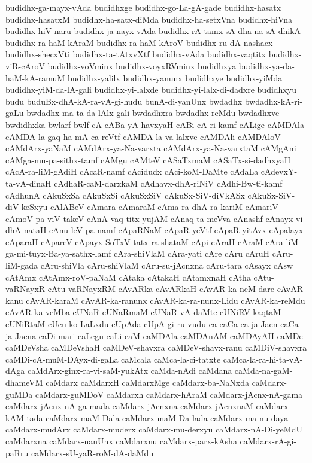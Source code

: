 {budidhx-ga-mayx-vAda
budidhxge
budidhx-go-La-gA-gade
budidhx-hasatx
budidhx-hasatxM
budidhx-ha-satx-diMda
budidhx-ha-setxVna
budidhx-hiVna
budidhx-hiV-naru
budidhx-ja-nayx-vAda
budidhx-rA-tamx-sA-dha-na-sA-dhikA
budidhx-ra-haM-kAraM
budidhx-ra-haM-kAroV
budidhx-ru-dA-nashacx
budidhx-shecxVti
budidhx-ta-tAtxvXtf
budidhx-vAda
budidhx-vaqtitx
budidhx-viR-cAroV
budidhx-voVminx
budidhx-voyxRVminx
budidhxya
budidhx-ya-da-haM-kA-ramuM
budidhx-yalilx
budidhx-yanunx
budidhxye
budidhx-yiMda
budidhx-yiM-da-lA-gali
budidhx-yi-lalxde
budidhx-yi-lalx-di-dadxre
budidhxyu
budu
buduBx-dhA-kA-ra-vA-gi-hudu
bunA-di-yanUnx
bwdadhx
bwdadhx-kA-ri-gaLu
bwdadhx-ma-ta-da-lAlx-gali
bwdadhxra
bwdadhx-reMdu
bwdadhxve
bwdidhxka
bwlarf
bwlf
cA
cABa-yA-havxyaH
cABi-cA-ri-kamf
cALige
cAMDAla
cAMDA-la-gaq-ha-mA-ca-reVtf
cAMDA-la-va-lalxve
cAMDAli
cAMDAloV
cAMdArx-yaNaM
cAMdArx-ya-Na-varxta
cAMdArx-ya-Na-varxtaM
cAMgAni
cAMga-mu-pa-sithx-tamf
cAMgu
cAMteV
cASaTxmaM
cASaTx-si-dadhxyaH
cAcA-ra-liM-gAdiH
cAcaR-namf
cAcidudx
cAci-koM-DaMte
cAdaLa
cAdevxY-ta-vA-dinaH
cAdhaR-caM-darxkaM
cAdhavx-dhA-riNiV
cAdhi-Bw-ti-kamf
cAdhunA
cAkuSxSa
cAkuSxSi
cAkuSxSiV
cAkuSx-SiV-diVkASx
cAkuSx-SiV-diV-keSxyu
cAlABeV
cAmara
cAmaraM
cAma-ra-dhA-ra-kariM
cAmariV
cAmoV-pa-viV-takeV
cAnA-vaq-titx-yujAM
cAnaq-ta-meVva
cAnashf
cAnayx-vi-dhA-nataH
cAnu-leV-pa-namf
cApaRNaM
cApaR-yeVtf
cApaR-yitAvx
cApalayx
cAparaH
cApareV
cApayx-SoTxV-tatx-ra-shataM
cApi
cAraH
cAraM
cAra-liM-ga-mi-tuyx-Ba-ya-sathx-lamf
cAra-shiVlaM
cAra-yati
cAre
cAru
cAruH
cAru-liM-gada
cAru-shiVla
cAru-shiVlaM
cAru-su-jAcnxna
cAru-tara
cAsayx
cAsw
cAtAmx
cAtAmx-roV-paNaM
cAtaka
cAtakaH
cAtamxnaH
cAtha
cAtu-vaRNayxR
cAtu-vaRNayxRM
cAvARka
cAvARkaH
cAvAR-ka-neM-dare
cAvAR-kanu
cAvAR-karaM
cAvAR-ka-ranunx
cAvAR-ka-ra-nunx-Lidu
cAvAR-ka-reMdu
cAvAR-ka-veMba
cUNaR
cUNaRmaM
cUNaR-vA-daMte
cUNiRV-kaqtaM
cUNiRtaM
cUcu-ko-LaLxdu
cUpAda
cUpA-gi-ru-vudu
ca
caCa-ca-ja-Jacn
caCa-ja-Jacna
caDi-mari
caLegu
caLi
caM
caMDAla
caMDAnAM
caMDAyAH
caMDe
caMDeVsha
caMDeVshaH
caMDeV-shavxra
caMDeV-shavx-ranu
caMDiV-shavxra
caMDi-cA-muM-DAyx-di-gaLa
caMcala
caMca-la-ci-tatxte
caMca-la-ra-hi-ta-vA-dAga
caMdArx-ginx-ra-vi-saM-yukAtx
caMda-nAdi
caMdana
caMda-na-gaM-dhameVM
caMdarx
caMdarxH
caMdarxMge
caMdarx-ba-NaNxda
caMdarx-guMDa
caMdarx-guMDoV
caMdarxh
caMdarx-hAraM
caMdarx-jAcnx-nA-gama
caMdarx-jAcnx-nA-ga-mada
caMdarx-jAcnxna
caMdarx-jAcnxnaM
caMdarx-kAM-tada
caMdarx-maM-Dala
caMdarx-maM-Da-lada
caMdarx-ma-nu-daya
caMdarx-mudArx
caMdarx-muderx
caMdarx-mu-derxyu
caMdarx-nA-Di-yeMdU
caMdarxna
caMdarx-nanUnx
caMdarxnu
caMdarx-parx-kAsha
caMdarx-rA-gi-paRru
caMdarx-sU-yaR-roM-dA-daMdu
}
